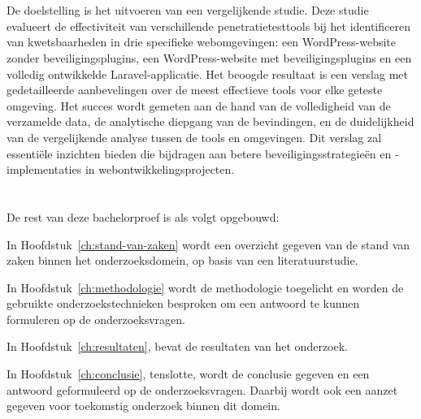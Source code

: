 \section{}%
\label{sec:onderzoeksdoelstelling}
De doelstelling is het uitvoeren van een vergelijkende studie. Deze studie evalueert de effectiviteit van 
verschillende penetratietesttools bij het identificeren van kwetsbaarheden in drie specifieke webomgevingen: een WordPress-website 
zonder beveiligingsplugins, een WordPress-website met beveiligingsplugins en een volledig ontwikkelde Laravel-applicatie.
Het beoogde resultaat is een verslag met gedetailleerde aanbevelingen over de meest effectieve tools voor elke geteste 
omgeving. Het succes wordt gemeten aan de hand van de volledigheid van de verzamelde data, de analytische diepgang van de bevindingen, 
en de duidelijkheid van de vergelijkende analyse tussen de tools en omgevingen. Dit verslag zal essentiële inzichten bieden die 
bijdragen aan betere beveiligingsstrategieën en -implementaties in webontwikkelingsprojecten.
\section{}%
\label{sec:opzet-bachelorproef}


De rest van deze bachelorproef is als volgt opgebouwd:

In Hoofdstuk~\ref{ch:stand-van-zaken} wordt een overzicht gegeven van de stand van zaken binnen het onderzoeksdomein, op basis van een literatuurstudie.

In Hoofdstuk~\ref{ch:methodologie} wordt de methodologie toegelicht en worden de gebruikte onderzoekstechnieken besproken om een antwoord te kunnen formuleren op de onderzoeksvragen.

In Hoofdstuk~\ref{ch:resultaten}, bevat de resultaten van het onderzoek.

In Hoofdstuk~\ref{ch:conclusie}, tenslotte, wordt de conclusie gegeven en een antwoord geformuleerd op de onderzoeksvragen. Daarbij wordt ook een aanzet gegeven voor toekomstig onderzoek binnen dit domein.